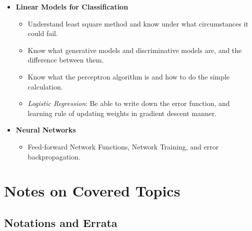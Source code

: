 \documentclass[11pt]{article} %
\begin{document}
\begin{itemize}
\begin{itemize}
\end{itemize}
\item {\bf Linear Models for Classification}
\begin{itemize}
\itemsep -2pt
\item Understand least square method and know under what circumstances it could fail.
\item Know what generative models and discriminative models are, and the difference between them.
\item Know what the perceptron algorithm is and how to do the simple calculation.
\item {\em Logistic Regression}: Be able to write down the error function, and learning rule of updating weights in gradient descent manner.
\end{itemize}
\item {\bf Neural Networks}
\begin{itemize}
\itemsep -2pt
\item Feed-forward Network Functions, Network Training, and error backpropagation.
\end{itemize}
\end{itemize}

\section{Notes on Covered Topics}

\subsection{Notations and Errata}
\end{document}
